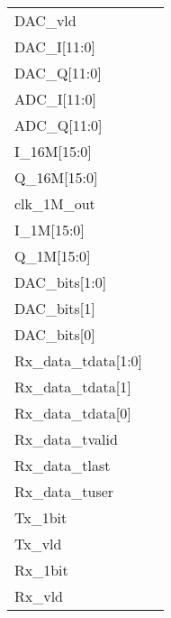 \documentclass[journal,twoside]{IEEEtran}
\begin{document}
\begin{figure*}
  \setlength{\tabcolsep}{2pt}
  \sffamily\notsotiny
  \newcommand\Modulation{QPSK}%
  \newcommand\isBPSK0%
  \newcommand\Color{mygreen}
  \begin{tabularx}{\linewidth}{@{}lX@{}}
    DAC\_vld &  \\
    DAC\_I[11:0] &  \\
    DAC\_Q[11:0] &  \\
    ADC\_I[11:0] &  \\
    ADC\_Q[11:0] &  \\
    I\_16M[15:0] &  \\
    Q\_16M[15:0] &  \\
    clk\_1M\_out &  \\
    I\_1M[15:0] &  \\
    Q\_1M[15:0] &  \\
    DAC\_bits[1:0] &  \\
    DAC\_bits[1] &  \\
    DAC\_bits[0] &  \\
    Rx\_data\_tdata[1:0] &  \\
    Rx\_data\_tdata[1] &  \\
    Rx\_data\_tdata[0] &  \\
    Rx\_data\_tvalid &  \\
    Rx\_data\_tlast &  \\
    Rx\_data\_tuser &  \\
    Tx\_1bit &  \\
    Tx\_vld &  \\
    Rx\_1bit &  \\
    Rx\_vld &  \\
  \end{tabularx}%
\end{figure*}
\end{document}
